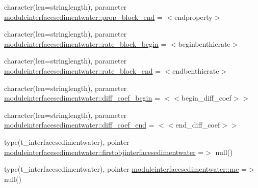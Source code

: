 \begin{DoxyCompactItemize}
\item 
character(len=stringlength), parameter \mbox{\hyperlink{namespacemoduleinterfacesedimentwater_a4021d17f3a718269c43fde1c7967b12a}{moduleinterfacesedimentwater\+::prop\+\_\+block\+\_\+end}} = \textquotesingle{}$<$endproperty$>$\textquotesingle{}
\item 
character(len=stringlength), parameter \mbox{\hyperlink{namespacemoduleinterfacesedimentwater_aed70983784ad7096657498952a181f00}{moduleinterfacesedimentwater\+::rate\+\_\+block\+\_\+begin}} = \textquotesingle{}$<$beginbenthicrate$>$\textquotesingle{}
\item 
character(len=stringlength), parameter \mbox{\hyperlink{namespacemoduleinterfacesedimentwater_aa259136976f9e453b7c25e5291fdb787}{moduleinterfacesedimentwater\+::rate\+\_\+block\+\_\+end}} = \textquotesingle{}$<$endbenthicrate$>$\textquotesingle{}
\item 
character(len=stringlength), parameter \mbox{\hyperlink{namespacemoduleinterfacesedimentwater_ac7261e1681e2edb95dca762fde562ef7}{moduleinterfacesedimentwater\+::diff\+\_\+coef\+\_\+begin}} = \textquotesingle{}$<$$<$begin\+\_\+diff\+\_\+coef$>$$>$\textquotesingle{}
\item 
character(len=stringlength), parameter \mbox{\hyperlink{namespacemoduleinterfacesedimentwater_aaa8c062f7adf40df72c79b2258fecf27}{moduleinterfacesedimentwater\+::diff\+\_\+coef\+\_\+end}} = \textquotesingle{}$<$$<$end\+\_\+diff\+\_\+coef$>$$>$\textquotesingle{}
\item 
type(t\+\_\+interfacesedimentwater), pointer \mbox{\hyperlink{namespacemoduleinterfacesedimentwater_aee59df166f2edf5e9a6bdf9c9e244666}{moduleinterfacesedimentwater\+::firstobjinterfacesedimentwater}} =$>$ null()
\item 
type(t\+\_\+interfacesedimentwater), pointer \mbox{\hyperlink{namespacemoduleinterfacesedimentwater_a7efbde1b20927018dae3a1223b393ee9}{moduleinterfacesedimentwater\+::me}} =$>$ null()
\end{DoxyCompactItemize}
